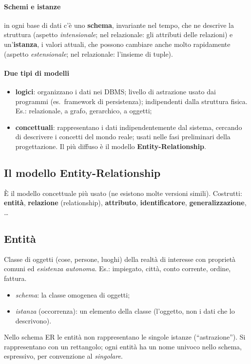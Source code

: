 \documentclass[a4paper,12pt]{article}
\begin{document}
\paragraph{Schemi e istanze} in ogni base di dati c'è uno \textbf{schema},
invariante nel tempo, che ne descrive la struttura (aspetto
\emph{intensionale}; nel relazionale: gli attributi delle relazioni) e
un'\textbf{istanza}, i valori attuali, che possono cambiare anche molto
rapidamente (aspetto \emph{estensionale}; nel relazionale: l'insieme di
tuple).

\paragraph{Due tipi di modelli}
\begin{itemize}
  \item \textbf{logici}: organizzano i dati nei DBMS; livello di astrazione
    usato dai programmi (es.\ framework di persistenza); indipendenti dalla
    struttura fisica. Es.: relazionale, a grafo, gerarchico, a oggetti;
  \item \textbf{concettuali}: rappresentano i dati indipendentemente dal
    sistema, cercando di descrivere i concetti del mondo reale; usati nelle
    fasi preliminari della progettazione. Il più diffuso è il modello
    \textbf{Entity-Relationship}.
\end{itemize}

\subsection{Il modello Entity-Relationship}

È il modello concettuale più usato (ne esistono molte versioni simili).
Costrutti: \textbf{entità}, \textbf{relazione} (relationship),
\textbf{attributo}, \textbf{identificatore}, \textbf{generalizzazione},
\dots

\subsection{Entità}

Classe di oggetti (cose, persone, luoghi) della realtà di interesse con
proprietà comuni ed \emph{esistenza autonoma}. Es.: impiegato, città, conto
corrente, ordine, fattura.
\begin{itemize}
  \item \emph{schema}: la classe omogenea di oggetti;
  \item \emph{istanza} (occorrenza): un elemento della classe (l'oggetto, non
    i dati che lo descrivono).
\end{itemize}
Nello schema ER le entità non rappresentano le singole istanze
(``astrazione''). Si rappresentano con un rettangolo; ogni entità ha un nome
univoco nello schema, espressivo, per convenzione al \emph{singolare}.
\begin{center}
\end{center}
\end{document}
